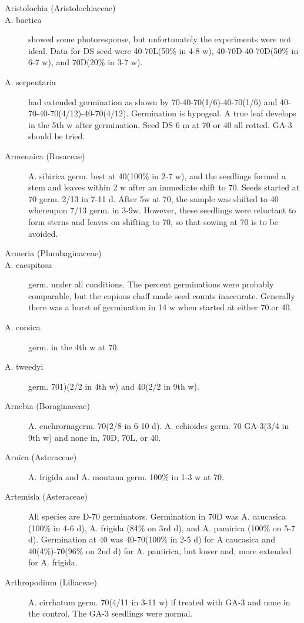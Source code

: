 \begin{description}
\item[Aristolochia (Aristolochiaceae)]
\item[A. baetica] showed some photoresponse, but unfortunately the experiments
were not ideal. Data for DS seed were 40-70L(50\% in 4-8 w), 40-70D-40-70D(50\% in
6-7 w), and 70D(20\% in 3-7 w).
\item[A. serpentaria] had extended germination as shown by 70-40-70(1/6)-40-70(1/6)
and 40-70-40-70(4/12)-40-70(4/12). Germination is hypogeal. A true leaf develops in
the 5th w after germination. Seed DS 6 m at 70 or 40 all rotted. GA-3 should be tried.

\item[Armenaica (Rosaceae)] A. sibirica germ. best at 40(100\% in 2-7 w), and
the seedlings formed a stem and leaves within 2 w after an immediate shift to 70.
Seeds started at 70 germ. 2/13 in 7-11 d. After 5w at 70, the sample was shifted to 40
whereupon 7/13 germ. in 3-9w. However, these seedlings were reluctant to form
sterns and leaves on shifting to 70, so that sowing at 70 is to be avoided.

\item[Armeria (Plumbaginaceae)]
\item[A. caespitosa] germ. under all conditions. The percent germinations were
probably comparable, but the copious chaff made seed counts inaccurate. Generally
there was a burst of germination in 14 w when started at either 70.or 40.
\item[A. corsica] germ. in the 4th w at 70.
\item[A. tweedyi] germ. 701)(2/2 in 4th w) and 40(2/2 in 9th w).

\item[Arnebia (Boraginaceae)] A. euchrornagerm. 70(2/8 in 6-10 d). A.
echioides germ. 70 GA-3(3/4 in 9th w) and none in, 70D, 70L, or 40.
\item[Arnica (Asteraceae)] A. frigida and A. montana germ. 100\% in 1-3 w at 70.
\item[Artemisla (Asteraceae)] All species are D-70 germinators. Germination in
70D was A. caucasica (100\% in 4-6 d), A. frigida (84\% on 3rd d), and A. pamirica
(100\% on 5-7 d). Germination at 40 was 40-70(100\% in 2-5 d) for A caucasica and
40(4\%)-70(96\% on 2nd d) for A. pamirica, but lower and, more extended for A. frigida.

\item[Arthropodium (Liliaceae)] A. cirrhatum germ. 70(4/11 in 3-11 w) if treated
with GA-3 and none in the control. The GA-3 seedlings were normal.


\end{description}
